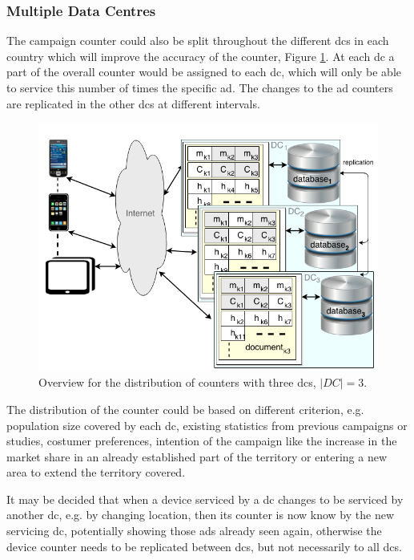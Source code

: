 \subsubsection{Multiple Data Centres}
The campaign counter could also be split throughout the different \glspl{dc} in each country which will improve the accuracy of the counter, Figure \ref{fig:ads_countert_}. At each \gls{dc} a part of the overall counter would be assigned to each \gls{dc}, which will only be able to service this number of times the specific ad. The changes to the ad counters are replicated in the other \glspl{dc} at different intervals.
\begin{figure}[ht!]
	\centering
	\includegraphics[width=1\linewidth]{figures/AdsServiceSpread2DCs.png}

	\caption{Overview for the distribution of counters with three \glspl{dc}, $|DC| = 3$.}
	\label{fig:ads_countert_}
\end{figure}

The distribution of the counter could be based on different criterion, e.g. population size covered by each \gls{dc}, existing statistics from previous campaigns or studies, costumer preferences, intention of the campaign like the increase in the market share in an already established part of the territory or entering a new area to extend the territory covered.

It may be decided that when a device serviced by a \gls{dc} changes to be serviced by another \gls{dc}, e.g. by changing location, then its counter is now know by the new servicing \gls{dc}, potentially showing those ads already seen again, otherwise the device counter needs to be replicated between \glspl{dc}, but not necessarily to all \glspl{dc}.

